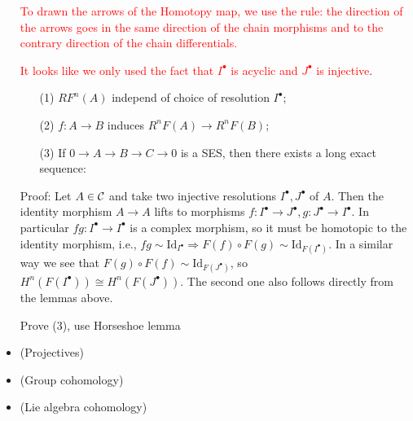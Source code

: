 \begin{itemize}
    \begin{remark}
        \textcolor{red}{To drawn the arrows of the Homotopy map, we use the rule: the direction of the arrows goes in the 
        same direction of the chain morphisms and to the contrary direction of the chain differentials.}
    \end{remark}
    
    \begin{remark}
        \textcolor{red}{It looks like we only used the fact that $I^\bullet$ is acyclic and 
        $J^\bullet$ is injective}.
    \end{remark}

    \begin{theorem}
        \begin{itemize}
            \item[(1)] $RF^n(A)$ independ of choice of resolution $I^\bullet$;
            \item[(2)] $f:A\to B$ induces $R^nF(A)\to R^nF(B)$;
            \item[(3)] If $0\to A\to B\to C\to 0$ is a SES, then there exists a long exact sequence:
            \begin{center}
            \end{center}  
        \end{itemize}
    \end{theorem}
    Proof: Let $A\in\callC$ and take two injective resolutions $I^\bullet, J^\bullet$ of $A$. Then 
    the identity morphism $A\to A$ lifts to morphisms $f:I^\bullet \to J^\bullet, g:J^\bullet\to I^\bullet$. 
    In particular $fg: I^\bullet\to I^\bullet$ is a complex morphism, so it must be homotopic to the identity 
    morphism, i.e., $fg\sim\text{Id}_{I^\bullet}\Rightarrow F(f)\circ F(g)\sim \text{Id}_{F(I^\bullet)}$. In 
    a similar way we see that $F(g)\circ F(f)\sim \text{Id}_{F(J^\bullet)}$, so $H^n(F(I^\bullet))\cong H^n(F(J^\bullet))$. 
    The second one also follows directly from the lemmas above.\par 
    \TODO Prove (3), use Horseshoe lemma  

    \item(Projectives)
    \item(Group cohomology)
    \item(Lie algebra cohomology)
\end{itemize}